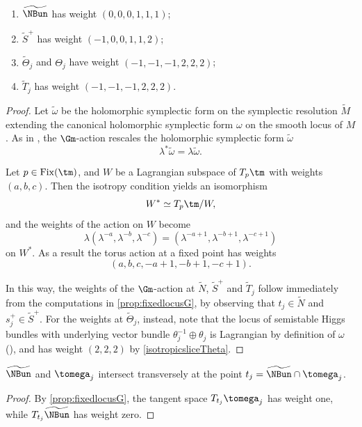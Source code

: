 \skpt
\begin{prop}\label{prop:weight}
\begin{enumerate}
\item\label{item:wP3} $\widetilde{\NBun}$ has weight $(0,0,0,1,1,1)$;
\item\label{item:wS+} $\widetilde{S}^+$ has weight $(-1,0,0,1,1,2)$;
\item\label{item:wTheta} $\widetilde{\Theta}_j$ and $\Theta_j$ have weight $(-1,-1,-1,2,2,2)$;
\item\label{item:wTj} $\widetilde{T}_j$ has weight $(-1,-1,-1,2,2,2)$.
\end{enumerate}
\end{prop}
\begin{proof}
Let $\widetilde{\omega}$ be the holomorphic symplectic form on the symplectic resolution $\widetilde{M}$ extending the canonical holomorphic symplectic form $\omega$ on the smooth locus of $M$.
As in \cite[Prop.\,7.1]{Hitchin1987}, the $\Gm$\nobreakdash-action rescales the holomorphic symplectic form $\widetilde{\omega}$
\[
\lambda^*\widetilde{\omega} = \lambda \widetilde{\omega}.
\]

Let $p\in \mathrm{Fix}(\tm)$, and $W$ be a Lagrangian subspace of $T_p\tm$ with weights $(a,b,c)$. Then the isotropy condition yields an isomorphism
\[
W^*\simeq T_p\tm/W,
\]
and the weights of the action on $W$ become
\[
\lambda (\lambda^{-a}, \lambda^{-b}, \lambda^{-c}) = (\lambda^{-a+1}, \lambda^{-b+1}, \lambda^{-c+1})
\]
on $W^*$. As a result the torus action at a fixed point has weights
\[
(a,b,c,-a+1,-b+1,-c+1).
\]

In this way, the weights of the $\Gm$\nobreakdash-action at $\widetilde{N}$, $\widetilde{S}^{+}$ and $\widetilde{T}_j$ follow immediately from the computations in \cref{prop:fixedlocusG}, by observing that $t_j \in \widetilde{N}$ and $s^{+}_j \in \widetilde{S}^{+}$. For the weights at $\widetilde{\Theta}_j$, instead, note that the locus of semistable Higgs bundles with underlying vector bundle $\theta^{-1}_j \oplus \theta_j$ is Lagrangian by definition of $\omega$ (\cf \cite[Lem.\,6.8]{Hitchin1987}), and has weight $(2,2,2)$ by \eqref{isotropicsliceTheta}.
\end{proof}

\begin{cor}\label{cor:tansverseintersection}
$\widetilde{\NBun}$ and $\tomega_j$ intersect transversely at the point $t_j = \widetilde{\NBun} \cap \tomega_j$.
\end{cor}
\begin{proof}
By \cref{prop:fixedlocusG}, the tangent space $T_{t_j}\tomega_j$ has weight one, while $T_{t_j}\widetilde{\NBun}$ has weight zero.
\end{proof}

